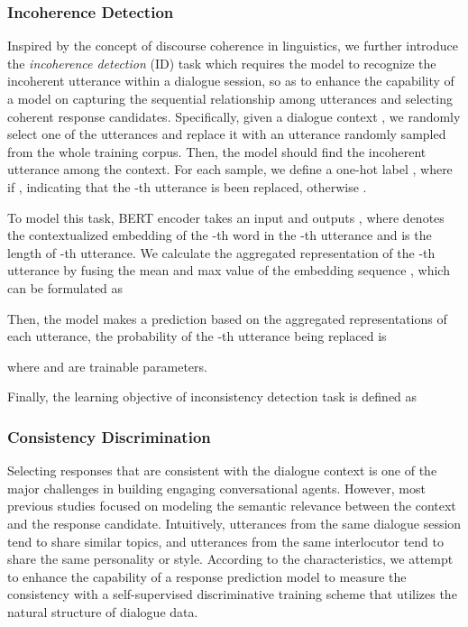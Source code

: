\documentclass{article}
\begin{document}
\subsubsection{Incoherence Detection}
Inspired by the concept of discourse coherence \cite{jurafsky2000speech} in linguistics, we further introduce the \emph{incoherence detection} (ID) task which requires the model  to  recognize  the  incoherent  utterance  within  a  dialogue session, so as to enhance the capability of a model on capturing the sequential relationship among utterances and selecting coherent response candidates.
Specifically, given a dialogue context , we randomly select one of the utterances  and replace it with an utterance randomly sampled from the whole training corpus.
Then, the model should find the incoherent utterance among the context. For each sample, we define a one-hot label  , where  if , indicating that the -th utterance is been replaced, otherwise . 

To model this task, BERT encoder takes an input 
and outputs ,
where  denotes the contextualized embedding of the -th word in the -th utterance and  is the length of -th utterance.
We calculate the aggregated representation of the -th utterance by fusing the mean and max value of the embedding sequence , which can be formulated as

Then, the model makes a prediction based on the aggregated  representations of each utterance, the probability of the -th utterance being replaced is

where  and  are trainable parameters.

Finally, the learning objective of inconsistency detection task is defined as


\subsubsection{Consistency Discrimination} Selecting responses that are consistent with the dialogue context is one of the major challenges
in building engaging conversational agents. However, most previous studies focused on modeling the semantic relevance between the context and the response candidate.
Intuitively, utterances from the same dialogue session tend to share similar topics, and utterances from the same interlocutor tend to share the same personality or style.
According to the characteristics, we attempt to enhance the capability of a response prediction model to measure the  consistency with a self-supervised discriminative training scheme that utilizes the natural structure of dialogue data.
\end{document}
